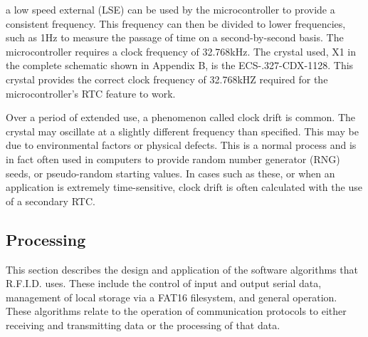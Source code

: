 \DIFdelend %
\DIFaddbegin {}\DIFaddend a low speed external (LSE) \DIFdelbegin {}\DIFdelend \DIFaddbegin {}\DIFaddend can be used by the microcontroller to provide a consistent frequency. This frequency can then be divided to lower frequencies, such as 1Hz to measure the passage of time on a second-by-second basis. The microcontroller requires a clock frequency of 32.768kHz. The crystal used, X1 in the complete schematic shown in Appendix B, is the ECS-.327-CDX-1128. This crystal provides the correct clock frequency of 32.768kHZ required for the microcontroller's RTC feature to work.

Over a period of extended use, a phenomenon called clock drift is common. The crystal may oscillate at a slightly different frequency than \DIFdelbegin {}\DIFdelend \DIFaddbegin {}\DIFaddend specified. This may be due to environmental factors or physical defects. This is a normal process and is in fact often used in computers to provide random number generator (RNG) seeds, or pseudo-random starting values. In cases such as these, or when an application is extremely time-sensitive, clock drift is often calculated with the use of a secondary RTC.

\subsection{Processing}
This section describes the design and application of the software algorithms that R.F.I.D. uses. These include the control of input and output serial data, management of local storage via a FAT16 filesystem, and general operation. These algorithms relate to the operation of communication protocols to either receiving and transmitting data or the processing of that data.



